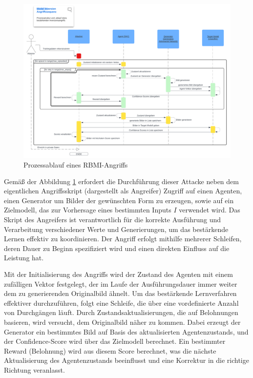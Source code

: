 \begin{figure}
	\centering
	\includegraphics[width=\linewidth]{Bilder/RBMI_PROCESS.png}
	\caption{Prozessablauf eines RBMI-Angriffs}
	\label{img:rbmi_process}
\end{figure}

Gemäß der Abbildung \ref{img:rbmi_process} erfordert die Durchführung dieser Attacke neben dem eigentlichen Angriffsskript (dargestellt als Angreifer) Zugriff auf einen Agenten, einen Generator um Bilder der gewünschten Form zu erzeugen, sowie auf ein Zielmodell, das zur Vorhersage eines bestimmten Inputs $I$ verwendet wird. Das Skript des Angreifers ist verantwortlich für die korrekte Ausführung und Verarbeitung verschiedener Werte und Generierungen, um das bestärkende Lernen effektiv zu koordinieren. Der Angriff erfolgt mithilfe mehrerer Schleifen, deren Dauer zu Beginn spezifiziert wird und einen direkten Einfluss auf die Leistung hat.

Mit der Initialisierung des Angriffs wird der Zustand des Agenten mit einem zufälligen Vektor festgelegt, der im Laufe der Ausführungsdauer immer weiter dem zu generierenden Originalbild ähnelt. Um das bestärkende Lernverfahren effektiver durchzuführen, folgt eine Schleife, die über eine vordefinierte Anzahl von Durchgängen läuft. Durch Zustandsaktualisierungen, die auf Belohnungen basieren, wird versucht, dem Originalbild näher zu kommen. Dabei erzeugt der Generator ein bestimmtes Bild auf Basis des aktualisierten Agentenzustands, und der Confidence-Score wird über das Zielmodell berechnet. Ein bestimmter Reward (Belohnung) wird aus diesem Score berechnet, was die nächste Aktualisierung des Agentenzustands beeinflusst und eine Korrektur \glqq in die richtige Richtung\grqq{} veranlasst.

